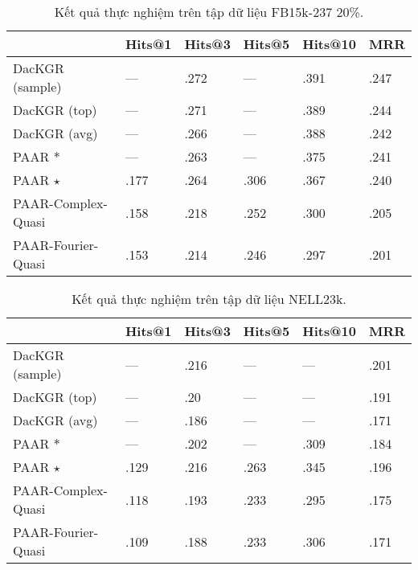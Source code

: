 \begin{center}
    \begin{table}[H]
        \centering
        \caption{Kết quả thực nghiệm trên tập dữ liệu FB15k-237 20\%.}
        \begin{tabular}{llllll}
            \toprule
         & Hits@1 & Hits@3 & Hits@5 & Hits@10 & MRR \\
            \midrule
         DacKGR (sample) & --- &  .272 & --- &  .391&  .247\\
         DacKGR (top) & --- &  .271 & --- & .389 & .244 \\
         DacKGR (avg) & --- & .266 &---  & .388 & .242 \\
         PAAR $\ast$&---  &  .263 & --- &  .375&  .241\\
         PAAR $\star$&  .177&  .264 &  .306&  .367&  .240\\
         PAAR-Complex-Quasi &  .158 &  .218 &  .252&  .300& .205\\
         PAAR-Fourier-Quasi & .153 & .214 & .246 & .297 & .201  \\
         \bottomrule
        \end{tabular}
    \end{table}
\end{center}


\begin{center}
    \begin{table}[H]
        \centering
        \caption{Kết quả thực nghiệm trên tập dữ liệu NELL23k.}
        \begin{tabular}{llllll}
            \toprule
         & Hits@1 & Hits@3 & Hits@5 & Hits@10 & MRR \\
            \midrule
         DacKGR (sample) & --- &  .216 & --- & --- &  .201\\
         DacKGR (top) & --- &  .20 &---  & --- & .191 \\
         DacKGR (avg) & --- & .186 & --- & --- & .171 \\
         PAAR $\ast$& --- &  .202 & --- &  .309 &  .184\\
         PAAR $\star$&.129&.216 &.263&.345&.196\\
         PAAR-Complex-Quasi &.118 &.193&.233&.295&.175\\
         PAAR-Fourier-Quasi & .109 & .188 & .233 & .306 & .171  \\
         \bottomrule
        \end{tabular}
    \end{table}
\end{center}


